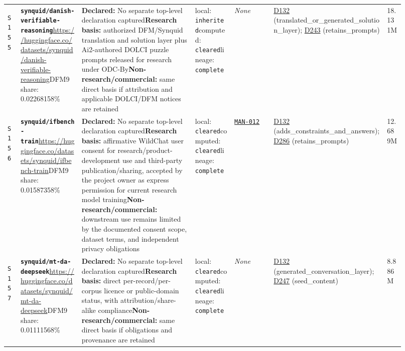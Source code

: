 \documentclass[9pt,a4paper]{article}
\newcommand{\srcid}[1]{\hypertarget{src:#1}{\texttt{#1}}}
\begin{document}
\begin{landscape}
\begin{longtable}{@{}L{0.03\linewidth}L{0.14\linewidth}L{0.26\linewidth}L{0.09\linewidth}L{0.09\linewidth}L{0.265\linewidth}L{0.045\linewidth}@{}}
\srcid{S155} & \textbf{\nolinkurl{synquid/danish-verifiable-reasoning}}\newline \url{https://huggingface.co/datasets/synquid/danish-verifiable-reasoning}\newline DFM9 share: 0.02268158\% & \textbf{Declared:} No separate top-level declaration captured\newline \textbf{Research basis:} authorized DFM/Synquid translation and solution layer plus Ai2-authored DOLCI puzzle prompts released for research under ODC-By\newline \textbf{Non-research/commercial:} same direct basis if attribution and applicable DOLCI/DFM notices are retained & local: \texttt{inherited}\newline computed: \texttt{cleared}\newline lineage: \texttt{complete} & \textit{None} & \hyperlink{dep:D132}{D132} (translated\_or\_generated\_solution\_layer); \hyperlink{dep:D243}{D243} (retains\_prompts) & 18.131M \\
\srcid{S156} & \textbf{\nolinkurl{synquid/ifbench-train}}\newline \url{https://huggingface.co/datasets/synquid/ifbench-train}\newline DFM9 share: 0.01587358\% & \textbf{Declared:} No separate top-level declaration captured\newline \textbf{Research basis:} affirmative WildChat user consent for research/product-development use and third-party publication/sharing, accepted by the project owner as express permission for current research model training\newline \textbf{Non-research/commercial:} downstream use remains limited by the documented consent scope, dataset terms, and independent privacy obligations & local: \texttt{cleared}\newline computed: \texttt{cleared}\newline lineage: \texttt{complete} & \hyperlink{manual:MAN-012}{\texttt{MAN-012}} & \hyperlink{dep:D132}{D132} (adds\_constraints\_and\_answers); \hyperlink{dep:D286}{D286} (retains\_prompts) & 12.689M \\
\srcid{S157} & \textbf{\nolinkurl{synquid/mt-da-deepseek}}\newline \url{https://huggingface.co/datasets/synquid/mt-da-deepseek}\newline DFM9 share: 0.01111568\% & \textbf{Declared:} No separate top-level declaration captured\newline \textbf{Research basis:} direct per-record/per-corpus licence or public-domain status, with attribution/share-alike compliance\newline \textbf{Non-research/commercial:} same direct basis if obligations and provenance are retained & local: \texttt{cleared}\newline computed: \texttt{cleared}\newline lineage: \texttt{complete} & \textit{None} & \hyperlink{dep:D132}{D132} (generated\_conversation\_layer); \hyperlink{dep:D247}{D247} (seed\_content) & 8.886M \\

\end{longtable}
\end{landscape}
\end{document}
